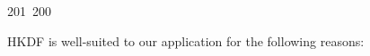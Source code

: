 201~200~\documentclass{article}
\begin{document}
	                                                                                                                                                                                                                                                                                                	                                                                                                                                        	    	                                                                                                	                                                                                                                                                                                                                                                            HKDF is well-suited to our application for the following reasons:
\end{document}
